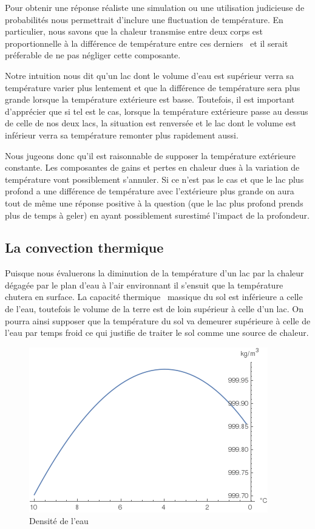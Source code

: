 \documentclass[12pt]{article}
\numberwithin{figure}{section}
\begin{document}
Pour obtenir une r\'eponse r\'ealiste une simulation ou une utilisation judicieuse de probabilit\'es
nous permettrait d'inclure une fluctuation de temp\'erature. En particulier, nous savons que la
chaleur transmise entre deux corps est proportionnelle \`a la diff\'erence de temp\'erature entre
ces derniers~\cite{Fourier} et il serait pr\'eferable de ne pas n\'egliger cette composante.

Notre intuition nous dit qu'un lac dont le volume d'eau est sup\'erieur verra sa temp\'erature
varier plus lentement et que la diff\'erence de temp\'erature sera plus grande lorsque la
temp\'erature ext\'erieure est basse. Toutefois, il est important d'appr\'ecier que si tel est le
cas, lorsque la temp\'erature ext\'erieure passe au dessus de celle de nos deux lacs, la situation
est renvers\'ee et le lac dont le volume est inf\'erieur verra sa temp\'erature remonter plus
rapidement aussi.

Nous jugeons donc qu'il est raisonnable de supposer la temp\'erature ext\'erieure constante. Les
composantes de gains et pertes en chaleur dues \`a la variation de temp\'erature vont possiblement
s'annuler. Si ce n'est pas le cas et que le lac plus profond a une diff\'erence de temp\'erature
avec l'ext\'erieure plus grande on aura tout de m\^eme une r\'eponse positive \`a la question (que
le lac plus profond prends plus de temps \`a geler) en ayant possiblement surestim\'e l'impact de
la profondeur.

\subsection{La convection thermique}\label{Convec}

Puisque nous \'evaluerons la diminution de la temp\'erature d'un lac par la chaleur d\'egag\'ee par
le plan d'eau \`a l'air environnant il s'ensuit que la temp\'erature chutera en surface. La
capacit\'e thermique~\cite{CapTherm} massique du sol est inf\'erieure a celle de l'eau, toutefois le
volume de la terre est de loin sup\'erieur \`a celle d'un lac. On pourra ainsi supposer que la
temp\'erature du sol va demeurer sup\'erieure \`a celle de l'eau par temps froid ce qui justifie de
traiter le sol comme une source de chaleur.

\begin{figure}[h]\label{water-density}
    \centering
    \includegraphics[scale=0.7]{WaterDensity.png}
    \caption{Densit\'e de l'eau}
\end{figure}
\end{document}
